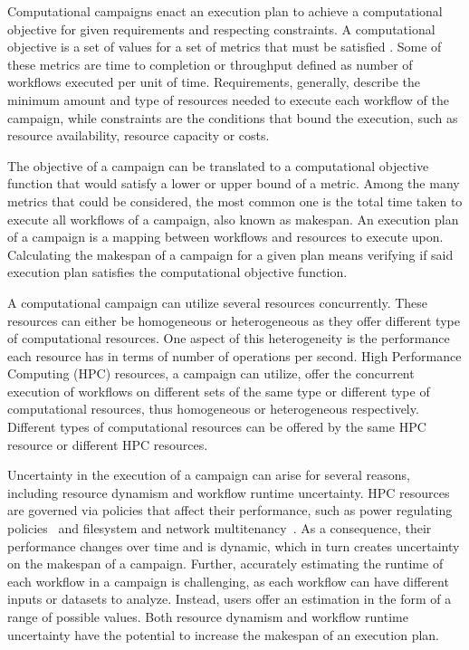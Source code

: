 \label{ch:campaigns}
Computational campaigns enact an execution plan to achieve a computational objective for given requirements and respecting constraints.
A computational objective is a set of values for a set of metrics that must be satisfied .
Some of these metrics are time to completion or throughput defined as number of workflows executed per unit of time.
Requirements, generally, describe the minimum amount and type of resources needed to execute each workflow of the campaign, while constraints are the conditions that bound the execution, such as resource availability, resource capacity or costs.

The objective of a campaign can be translated to a computational objective function that would satisfy a lower or upper bound of a metric.
Among the many metrics that could be considered, the most common one is the total time taken to execute all workflows of a campaign, also known as makespan.
An execution plan of a campaign is a mapping between workflows and resources to execute upon.
Calculating the makespan of a campaign for a given plan means verifying if said execution plan satisfies the computational objective function.

A computational campaign can utilize several resources concurrently.
These resources can either be homogeneous or heterogeneous as they offer different type of computational resources.
One aspect of this heterogeneity is the performance each resource has in terms of number of operations per second.
High Performance Computing (HPC) resources, a campaign can utilize, offer the concurrent execution of workflows on different sets of the same type or different type of computational resources, thus homogeneous or heterogeneous respectively.
Different types of computational resources can be offered by the same HPC resource or different HPC resources.

Uncertainty in the execution of a campaign can arise for several reasons, including resource dynamism and workflow runtime uncertainty.
HPC resources are governed via policies that affect their performance, such as power regulating policies~\cite{inadomi2015analyzing} and filesystem and network  multitenancy~\cite{brown2018interference}.
As a consequence, their performance changes over time and is dynamic, which in turn creates uncertainty on the makespan of a campaign.
Further, accurately estimating the runtime of each workflow in a campaign is challenging, as each workflow can have different inputs or datasets to analyze.
Instead, users offer an estimation in the form of a range of possible values.
Both resource dynamism and workflow runtime uncertainty have the potential to increase the makespan of an execution plan.

